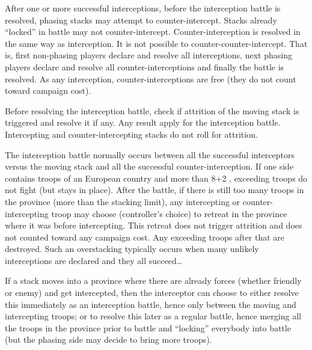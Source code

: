 After one or more successful interceptions, before the interception battle is
resolved, phasing stacks may attempt to counter-intercept. Stacks already
``locked'' in battle may not counter-intercept. Counter-interception is
resolved in the same way as interception. It is not possible to
counter-counter-intercept. That is, first non-phasing players declare and
resolve all interceptions, next phasing players declare and resolve all
counter-interceptions and finally the battle is resolved. As any interception,
counter-interceptions are free (they do not count toward campaign cost).

Before resolving the interception battle, check if attrition of the moving
stack is triggered and resolve it if any. Any  result apply
for the interception battle. Intercepting and counter-intercepting stacks do
not roll for attrition.

The interception battle normally occurs between all the successful
interceptors versus the moving stack and all the successful
counter-interception. If one side contains troops of an European country and
more than 8\LD+2 \Pashas, exceeding troops do not fight (but stays in
place). After the battle, if there is still too many troops in the province
(more than the stacking limit), any intercepting or counter-intercepting troop
may choose (controller's choice) to retreat in the province where it was
before intercepting. This retreat does not trigger attrition and does not
counted toward any campaign cost. Any exceeding troops after that are
destroyed. Such an overstacking typically occurs when many unlikely
interceptions are declared and they all succeed\ldots

If a stack moves into a province where there are already forces (whether
friendly or enemy) and get intercepted, then the interceptor can choose to
either resolve this immediately as an interception battle, hence only between
the moving and intercepting troops; or to resolve this later as a regular
battle, hence merging all the troops in the province prior to battle and
``locking'' everybody into battle (but the phasing side may decide to bring
more troops).

